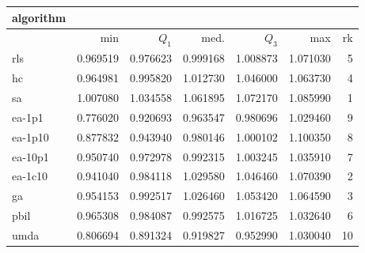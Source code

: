 \begin{tabular}{@{}l*{5}{>{{}}N{1}{2}}>{{}}N{2}{0}@{}}
\toprule
{algorithm} &  \\
\midrule
& {min} & {$Q_1$} & {med.} & {$Q_3$} & {max} & {rk}\\
\midrule
rls & 0.969519 & 0.976623 & 0.999168 & 1.008873 & 1.071030 & 5\\
hc & 0.964981 & 0.995820 & 1.012730 & 1.046000 & 1.063730 & 4\\
sa & {\color{blue}} 1.007080 & {\color{blue}} 1.034558 & {\color{blue}} 1.061895 & {\color{blue}} 1.072170 & 1.085990 & 1\\
ea-1p1 & 0.776020 & 0.920693 & 0.963547 & 0.980696 & 1.029460 & 9\\
ea-1p10 & 0.877832 & 0.943940 & 0.980146 & 1.000102 & {\color{blue}} 1.100350 & 8\\
ea-10p1 & 0.950740 & 0.972978 & 0.992315 & 1.003245 & 1.035910 & 7\\
ea-1c10 & 0.941040 & 0.984118 & 1.029580 & 1.046460 & 1.070390 & 2\\
ga & 0.954153 & 0.992517 & 1.026460 & 1.053420 & 1.064590 & 3\\
pbil & 0.965308 & 0.984087 & 0.992575 & 1.016725 & 1.032640 & 6\\
umda & 0.806694 & 0.891324 & 0.919827 & 0.952990 & 1.030040 & 10\\
\bottomrule
\end{tabular}
